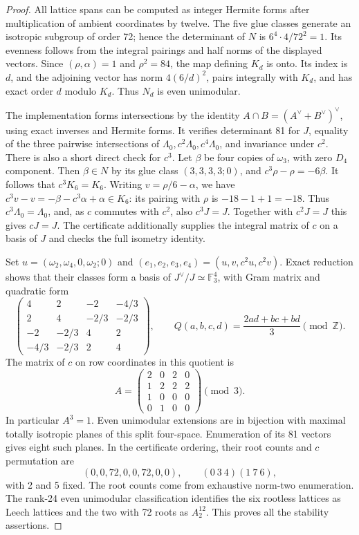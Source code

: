 \begin{proof}
All lattice spans can be computed as integer Hermite forms after
multiplication of ambient coordinates by twelve. The five glue
classes generate an isotropic subgroup of order 72; hence the
determinant of $N$ is $6^4\cdot4/72^2=1$. Its evenness follows
from the integral pairings and half norms of the displayed vectors.
Since $(\rho,\alpha)=1$ and $\rho^2=84$, the map defining $K_d$
is onto. Its index is $d$, and the adjoining vector has norm
$4(6/d)^2$, pairs integrally with $K_d$, and has exact order $d$
modulo $K_d$. Thus $N_d$ is even unimodular.

The implementation forms intersections by the identity
$A\cap B=(A^\vee+B^\vee)^\vee$, using exact inverses and Hermite
forms. It verifies determinant 81 for $J$, equality of the three
pairwise intersections of $\Lambda_0,c^2\Lambda_0,c^4\Lambda_0$,
and invariance under $c^2$. There is also a short direct check for
$c^3$. Let $\beta$ be four copies of $\omega_3$, with zero $D_4$
component. Then $\beta\in N$ by its glue class $(3,3,3,3;0)$, and
$c^3\rho-\rho=-6\beta$. It follows that $c^3K_6=K_6$.
Writing $v=\rho/6-\alpha$, we have
$c^3v-v=-\beta-c^3\alpha+\alpha\in K_6$:
its pairing with $\rho$ is $-18-1+1=-18$.
Thus $c^3\Lambda_0=\Lambda_0$, and, as $c$ commutes with $c^2$,
also $c^3J=J$. Together with $c^2J=J$ this gives $cJ=J$.
The certificate additionally supplies the integral matrix of $c$
on a basis of $J$ and checks the full isometry identity.

Set $u=(\omega_2,\omega_4,0,\omega_2;0)$ and
$(e_1,e_2,e_3,e_4)=(u,v,c^2u,c^2v)$. Exact reduction shows that
their classes form a basis of $J^\vee/J\simeq\mathbb F_3^4$,
with Gram matrix and quadratic form
\[
 \begin{pmatrix}
 4&2&-2&-4/3\\2&4&-2/3&-2/3\\
 -2&-2/3&4&2\\-4/3&-2/3&2&4
 \end{pmatrix},\qquad
 Q(a,b,c,d)=\frac{2ad+bc+bd}{3}\pmod{\mathbb Z}.
\]
The matrix of $c$ on row coordinates in this quotient is
\[
 A=\begin{pmatrix}
 2&0&2&0\\1&2&2&2\\1&0&0&0\\0&1&0&0
 \end{pmatrix}\pmod3.
\]
In particular $A^3=1$. Even unimodular extensions are in bijection
with maximal totally isotropic planes of this split four-space.
Enumeration of its 81 vectors gives eight such planes. In the
certificate ordering, their root counts and $c$ permutation are
\[
 (0,0,72,0,0,72,0,0),\qquad
 (0\ 3\ 4)(1\ 7\ 6),
\]
with 2 and 5 fixed. The root counts come from exhaustive norm-two
enumeration. The rank-24 even unimodular classification identifies
the six rootless lattices as Leech lattices and the two with 72 roots
as $A_2^{12}$. This proves all the stability assertions.


\end{proof}
